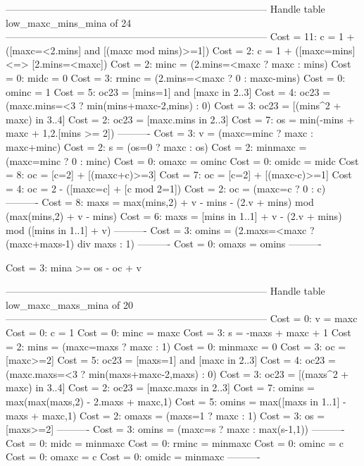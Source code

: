 --------------------------------------------------------------------------------
Handle table low_maxc_mins_mina of 24
--------------------------------------------------------------------------------
Cost = 11:  c       = 1 + ([maxc=<2.mins] and [(maxc mod mins)>=1])
Cost =  2:  c       = 1 + ([maxc=mins] <=> [2.mins=<maxc])
Cost =  2:  minc    = (2.mins=<maxc ? maxc : mins)
Cost =  0:  midc    = 0
Cost =  3:  rminc   = (2.mins=<maxc ? 0 : maxc-mins)
Cost =  0:  ominc   = 1
Cost =  5:  oc23    = [mins=1] and [maxc in 2..3]
Cost =  4:  oc23    = (maxc.mins=<3 ? min(mins+maxc-2,mins) : 0)
Cost =  3:  oc23    = [(mins^2 + maxc) in 3..4]
Cost =  2:  oc23    = [maxc.mins in 2..3]
Cost =  7:  os      = min(-mins + maxc + 1,2.[mins >= 2])
----------
Cost =  3:  v       = (maxc=minc ? maxc : maxc+minc)
Cost =  2:  s       = (os=0 ? maxc : os)
Cost =  2:  minmaxc = (maxc=minc ? 0 : minc)
Cost =  0:  omaxc   = ominc
Cost =  0:  omidc   = midc
Cost =  8:  oc      = [c=2] + [(maxc+c)>=3]
Cost =  7:  oc      = [c=2] + [(maxc-c)>=1]
Cost =  4:  oc      = 2 - ([maxc=c] + [c mod 2=1])
Cost =  2:  oc      = (maxc=c ? 0 : c)
----------
Cost =  8:  maxs    = max(mins,2) + v - mins - (2.v + mins) mod (max(mins,2) + v - mins)
Cost =  6:  maxs    = [mins in 1..1] + v - (2.v + mins) mod ([mins in 1..1] + v)
----------
Cost =  3:  omins   = (2.maxs=<maxc ? (maxc+maxs-1) div maxs : 1)
----------
Cost =  0:  omaxs   = omins
----------

Cost =  3:  mina >= os - oc + v

--------------------------------------------------------------------------------
Handle table low_maxc_maxs_mina of 20
--------------------------------------------------------------------------------
Cost =  0:  v       = maxc
Cost =  0:  c       = 1
Cost =  0:  minc    = maxc
Cost =  3:  s       = -maxs + maxc + 1
Cost =  2:  mins    = (maxc=maxs ? maxc : 1)
Cost =  0:  minmaxc = 0
Cost =  3:  oc      = [maxc>=2]
Cost =  5:  oc23    = [maxs=1] and [maxc in 2..3]
Cost =  4:  oc23    = (maxc.maxs=<3 ? min(maxs+maxc-2,maxs) : 0)
Cost =  3:  oc23    = [(maxs^2 + maxc) in 3..4]
Cost =  2:  oc23    = [maxc.maxs in 2..3]
Cost =  7:  omins   = max(max(maxs,2) - 2.maxs + maxc,1)
Cost =  5:  omins   = max([maxs in 1..1] - maxs + maxc,1)
Cost =  2:  omaxs   = (maxs=1 ? maxc : 1)
Cost =  3:  os      = [maxs>=2]
----------
Cost =  3:  omins   = (maxc=s ? maxc : max(s-1,1))
----------
Cost =  0:  midc    = minmaxc
Cost =  0:  rminc   = minmaxc
Cost =  0:  ominc   = c
Cost =  0:  omaxc   = c
Cost =  0:  omidc   = minmaxc
----------

